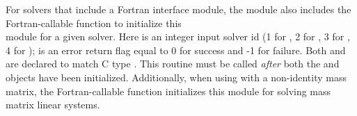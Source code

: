 For solvers that include a Fortran interface module, the
{\sunlinsollapband} module also includes the Fortran-callable
function  to initialize
this\\
\noindent {\sunlinsollapband} module for a given {\sundials} solver.
Here  is an integer input solver id (1 for {\cvode}, 2 for {\ida}, 3
for {\kinsol}, 4 for {\arkode});  is an error return flag 
equal to 0 for success and -1 for failure. Both  and 
are declared to match C type .
This routine must be called \emph{after} both the
{\nvector} and {\sunmatrix} objects have been initialized.
Additionally, when using {\arkode} with a non-identity mass matrix, the
Fortran-callable function   
initializes this {\sunlinsollapband} module for solving mass matrix
linear systems.
